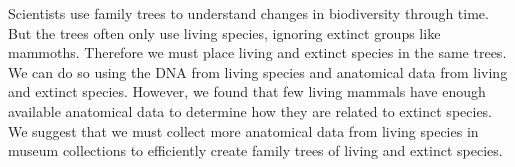 \documentclass{article} %
\begin{document}

Scientists use family trees to understand changes in biodiversity through time. But the trees often only use living species, ignoring extinct groups like mammoths. Therefore we must place living and 
extinct species in the same trees. We can do so using the DNA from living species and anatomical data from living and extinct species. However, we found that few living mammals have enough available anatomical data to determine how they are related to extinct species. We suggest that we must collect more anatomical data from living species in museum collections to efficiently create family trees of living and extinct species.
\end{document}
